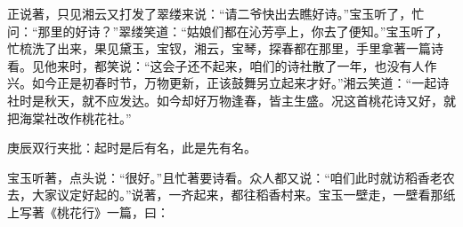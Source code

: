\begin{parag}
    正说著，只见湘云又打发了翠缕来说：“请二爷快出去瞧好诗。”宝玉听了，忙问：“那里的好诗？”翠缕笑道：“姑娘们都在沁芳亭上，你去了便知。”宝玉听了，忙梳洗了出来，果见黛玉，宝钗，湘云，宝琴，探春都在那里，手里拿著一篇诗看。见他来时，都笑说：“这会子还不起来，咱们的诗社散了一年，也没有人作兴。如今正是初春时节，万物更新，正该鼓舞另立起来才好。”湘云笑道：“一起诗社时是秋天，就不应发达。如今却好万物逢春，皆主生盛。况这首桃花诗又好，就把海棠社改作桃花社。”\begin{note}庚辰双行夹批：起时是后有名，此是先有名。\end{note}宝玉听著，点头说：“很好。”且忙著要诗看。众人都又说：“咱们此时就访稻香老农去，大家议定好起的。”说著，一齐起来，都往稻香村来。宝玉一壁走，一壁看那纸上写著《桃花行》一篇，曰：
\end{parag}


